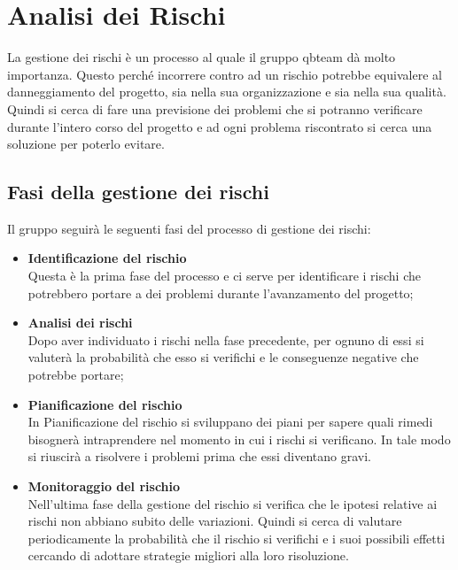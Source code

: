 \section{Analisi dei Rischi}
La gestione dei rischi è un processo al quale il gruppo qbteam dà molto importanza. Questo perché incorrere contro ad un rischio potrebbe equivalere al danneggiamento del progetto, sia nella sua organizzazione e sia nella sua qualità.
Quindi si cerca di fare una previsione dei problemi che si potranno verificare durante l'intero corso del progetto e ad ogni problema riscontrato si cerca una soluzione per poterlo evitare.

\subsection{Fasi della gestione dei rischi}
Il gruppo seguirà le seguenti fasi del processo di gestione dei rischi:
\begin{itemize}
	\item \textbf{Identificazione del rischio}
	\\ Questa è la prima fase del processo e ci serve per identificare i rischi che potrebbero portare a dei problemi durante l'avanzamento del progetto; 
\end{itemize}
\begin{itemize}
	\item \textbf{Analisi dei rischi}
	\\ Dopo aver individuato i rischi nella fase precedente, per ognuno di essi si valuterà la probabilità che esso si verifichi e le conseguenze negative che potrebbe portare;
\end{itemize}
\begin{itemize}
	\item \textbf{Pianificazione del rischio}
	\\ In Pianificazione del rischio si sviluppano dei piani per sapere quali rimedi bisognerà intraprendere nel momento in cui i rischi si verificano. In tale modo si riuscirà a risolvere i problemi prima che essi diventano gravi.
\end{itemize}
\begin{itemize}
	\item \textbf{Monitoraggio del rischio} 
	\\ Nell'ultima fase della gestione del rischio si verifica che le ipotesi relative ai rischi non abbiano subito delle variazioni. Quindi si cerca di valutare periodicamente la probabilità che il rischio si verifichi e i suoi possibili effetti cercando di adottare strategie migliori alla loro risoluzione.
\end{itemize}

